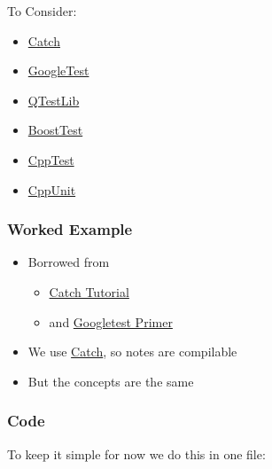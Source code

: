 To Consider:

\begin{itemize}
\itemsep1pt\parskip0pt
\item
  \href{https://github.com/philsquared/Catch}{Catch}
\item
  \href{https://code.google.com/p/googletest/}{GoogleTest}
\item
  \href{http://qt-project.org/doc/qt-4.8/qtestlib-manual.html}{QTestLib}
\item
  \href{http://www.boost.org/doc/libs/1_57_0/libs/test/doc/html/index.html}{BoostTest}
\item
  \href{http://cpptest.sourceforge.net/}{CppTest}
\item
  \href{http://sourceforge.net/projects/cppunit/}{CppUnit}
\end{itemize}

\subsubsection{Worked Example}\label{worked-example}

\begin{itemize}
\itemsep1pt\parskip0pt
\item
  Borrowed from

  \begin{itemize}
  \itemsep1pt\parskip0pt
  \item
    \href{https://github.com/philsquared/Catch/blob/master/docs/tutorial.md}{Catch
    Tutorial}
  \item
    and
    \href{https://code.google.com/p/googletest/wiki/V1_7_Primer}{Googletest
    Primer}
  \end{itemize}
\item
  We use \href{https://github.com/philsquared/Catch}{Catch}, so notes
  are compilable
\item
  But the concepts are the same
\end{itemize}

\subsubsection{Code}\label{code}

To keep it simple for now we do this in one file:

